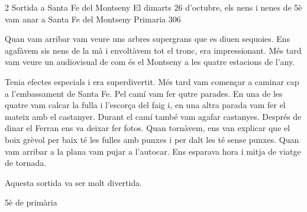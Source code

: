 
\begin{news}
{2} %
{Sortida a Santa Fe del Montseny}
{El dimarts 26 d'octubre,  els nens i nenes de 5è vam anar a Santa Fe del Montseny}
{Primaria}
{306}

\noindent{}


 Quan vam arribar vam veure uns arbres supergrans que es diuen sequoies. Ens agafàvem sis nens de la mà i envoltàvem tot el tronc, era impressionant. Més tard vam veure un audiovisual de com és el Montseny a les quatre estacions de l'any.

 Tenia efectes especials i era superdivertit. Més tard vam començar a caminar cap a l'embassament de Santa Fe. Pel camí vam fer qutre parades. En una de les quatre vam calcar la fulla i l'escorça del faig i, en una altra parada vam fer el mateix amb el castanyer. Durant el camí també  vam agafar castanyes. Després de dinar el Ferran ens va deixar fer fotos. Quan tornàvem,  ens van explicar que el boix grèvol per  baix té les fulles amb punxes i per dalt les té sense punxes. Quan vam arribar a la plana vam pujar a l'autocar. Ens esparava hora i mitja de viatge de tornada.


Aquesta sortida va ser molt divertida.


							{5è de primària}

\end{news}

